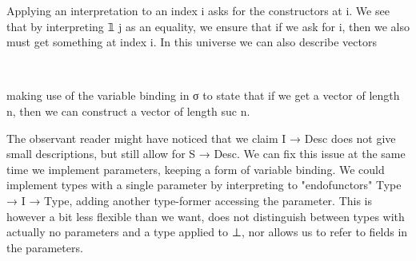 Applying an interpretation to an index i asks for the constructors at i. We see that by interpreting 𝟙 j as an equality, we ensure that if we ask for i, then we also must get something at index i. In this universe we can also describe vectors
\begin{code}%
%
\>[2]\AgdaSpace{}%
\AgdaSymbol{:}\AgdaSpace{}%
\AgdaSpace{}%
\AgdaSpace{}%
\AgdaSpace{}%
\<%
\\
%
\>[2]\AgdaSpace{}%
\AgdaSpace{}%
\AgdaSymbol{=}\AgdaSpace{}%
\AgdaSymbol{(}\AgdaSpace{}%
\AgdaSymbol{)}\AgdaSpace{}%
\AgdaSpace{}%
\AgdaSymbol{(}\AgdaSpace{}%
\AgdaSpace{}%
\AgdaSpace{}%
\AgdaSpace{}%
\AgdaSpace{}%
\AgdaSpace{}%
\AgdaSpace{}%
\AgdaSpace{}%
\AgdaBound{\AgdaUnderscore{}}\AgdaSpace{}%
\AgdaSpace{}%
\AgdaSpace{}%
\AgdaSpace{}%
\AgdaSymbol{(}\AgdaSpace{}%
\AgdaSymbol{(}\AgdaSpace{}%
\AgdaSymbol{)))}\<%
\end{code}
making use of the variable binding in σ to state that if we get a vector of length n, then we can construct a vector of length suc n.

The observant reader might have noticed that we claim I → Desc does not give small descriptions, but still allow for S → Desc. We can fix this issue at the same time we implement parameters, keeping a form of variable binding. We could implement types with a single parameter by interpreting to "endofunctors" Type → I → Type, adding another type-former accessing the parameter. This is however a bit less flexible than we want, does not distinguish between types with actually no parameters and a type applied to ⊥, nor allows us to refer to fields in the parameters.

